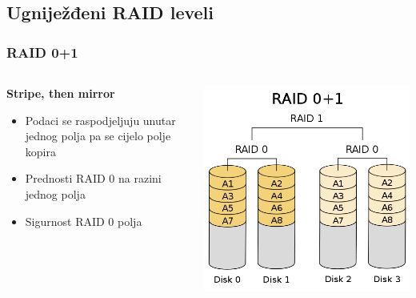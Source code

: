 \documentclass[t]{beamer}
\begin{document}
\subsection{Ugniježđeni RAID leveli}
\begin{frame}
	\frametitle{RAID 0+1}
	
	\begin{columns}[T]
	\begin{column}{0.55\textwidth}
		\textbf{Stripe, then mirror}
		\begin{itemize}
			\item Podaci se raspodjeljuju unutar jednog polja pa se cijelo polje kopira
		\end{itemize}
		\begin{itemize}
			\item Prednosti RAID 0 na razini jednog polja
			\item Sigurnost RAID 0 polja
		\end{itemize}
	\end{column}
	\begin{column}{0.45\textwidth}
		\includegraphics[width=\textwidth]{500px-RAID_01.png}
	\end{column}
	\end{columns}
\end{frame}
\end{document}
